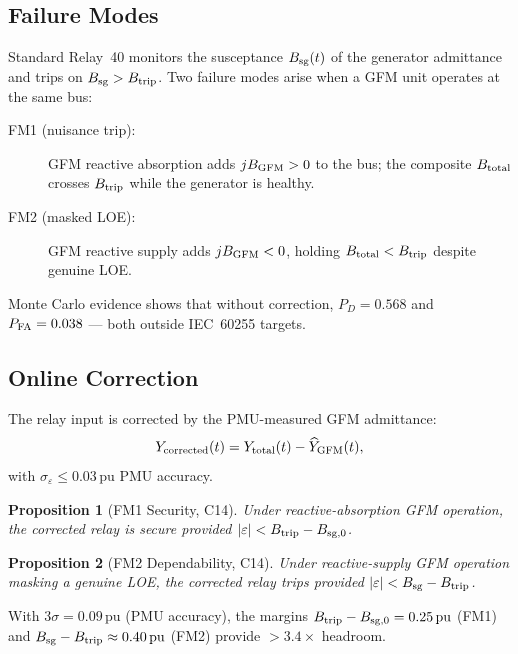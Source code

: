 \documentclass[journal,twoside]{IEEEtran}
\newtheorem{proposition}{Proposition}
\begin{document}
\subsection{Failure Modes}

Standard Relay~40 monitors the susceptance $B_{\rm sg}(t)$ of the generator
admittance and trips on $B_{\rm sg} > B_{\rm trip}$.
Two failure modes arise when a GFM unit operates at the same bus:
\begin{description}
  \item[FM1 (nuisance trip):] GFM reactive absorption adds $jB_{\rm GFM} > 0$
    to the bus; the composite $B_{\rm total}$ crosses $B_{\rm trip}$ while the
    generator is healthy.
  \item[FM2 (masked LOE):] GFM reactive supply adds $jB_{\rm GFM} < 0$,
    holding $B_{\rm total} < B_{\rm trip}$ despite genuine LOE.
\end{description}
Monte Carlo evidence shows that without correction, $P_D = 0.568$ and
$P_{\rm FA} = 0.038$ --- both outside IEC~60255 targets.

\subsection{Online Correction}

The relay input is corrected by the PMU-measured GFM admittance:
\begin{equation}
  Y_{\rm corrected}(t) = Y_{\rm total}(t) - \widehat{Y}_{\rm GFM}(t),
  \label{eq:ycorr}
\end{equation}
with $\sigma_\varepsilon \leq 0.03\,\text{pu}$ PMU accuracy.

\begin{proposition}[FM1 Security, C14]
\label{prop:fm1}
Under reactive-absorption GFM operation, the corrected relay is secure provided
$|\varepsilon| < B_{\rm trip} - B_{\rm sg,0}$.
\end{proposition}

\begin{proposition}[FM2 Dependability, C14]
\label{prop:fm2}
Under reactive-supply GFM operation masking a genuine LOE, the corrected relay
trips provided $|\varepsilon| < B_{\rm sg} - B_{\rm trip}$.
\end{proposition}

With $3\sigma = 0.09\,\text{pu}$ (PMU accuracy), the margins
$B_{\rm trip} - B_{\rm sg,0} = 0.25\,\text{pu}$ (FM1) and
$B_{\rm sg} - B_{\rm trip} \approx 0.40\,\text{pu}$ (FM2) provide
$> 3.4\times$ headroom.
\end{document}
